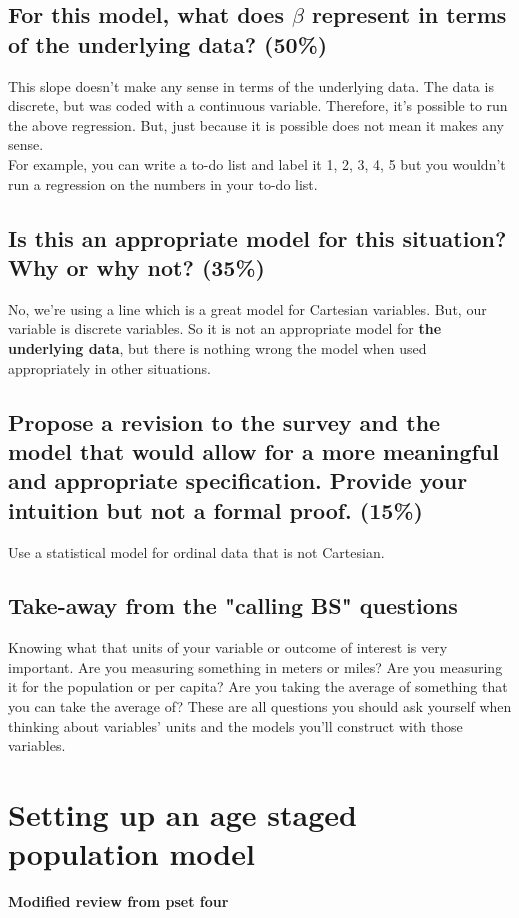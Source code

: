 \documentclass{article}
\begin{document}
\subsection{For this model, what does $\beta$ represent in terms of the underlying data? (50\%)}

This slope doesn't make any sense in terms of the underlying data. The data is discrete, but was coded with a continuous variable. Therefore, it's possible to run the above regression. But, just because it is possible does not mean it makes any sense. \\

For example, you can write a to-do list and label it 1, 2, 3, 4, 5 but you wouldn't run a regression on the numbers in your to-do list. 

\subsection{Is this an appropriate model for this situation? Why or why not? (35\%) }

No, we're using a line which is a great model for Cartesian variables. But, our variable is discrete variables. So it is not an appropriate model for \textbf{the underlying data}, but there is nothing wrong the model when used appropriately in other situations. 

\subsection{Propose a revision to the survey and the model that would allow for a more meaningful and appropriate specification. Provide your intuition but not a formal proof. (15\%)}

Use a statistical model for ordinal data that is not Cartesian. 


\subsection{Take-away from the "calling BS" questions}
Knowing what that units of your variable or outcome of interest is very important. Are you measuring something in meters or miles? Are you measuring it for the population or per capita? Are you taking the average of something that you can take the average of? These are all questions you should ask yourself when thinking about variables' units and the models you'll construct with those variables. 


\section{Setting up an age staged population model}
\textbf{Modified review from pset four}
\end{document}
